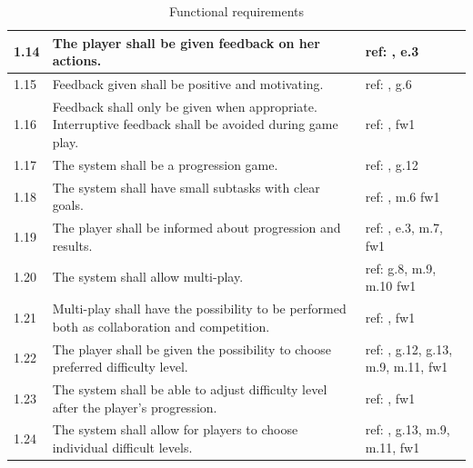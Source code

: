\begin{table} [H]
\centering
\begin{tabular}{|>{\raggedright}p{}|p{}|p{}|}
\hline
1.14 & The player shall be given feedback on her actions. & ref: \cite{sweetser}, e.3 \\ \hline
1.15 & Feedback given shall be positive and motivating. & ref: \cite{sweetser}, g.6 \\ \hline
1.16 & Feedback shall only be given when appropriate. Interruptive feedback shall be avoided during game play. &  ref: \cite{sweetser}, fw1 \\ \hline
1.17 & The system shall be a progression game. & ref: \cite{understandingvg} \cite{sweetser}, g.12 \\ \hline
1.18 & The system shall have small subtasks with clear goals. & ref: \cite{sweetser}, m.6 fw1\\ \hline
1.19 & The player shall be informed about progression and results. & ref: \cite{sweetser}, e.3, m.7, fw1 \\ \hline
1.20 & The system shall allow multi-play. & ref: g.8, m.9, m.10 fw1 \\ \hline
1.21 & Multi-play shall have the possibility to be performed both as collaboration and competition. & ref: \cite{sweetser}, fw1\\ \hline
1.22 & The player shall be given the possibility to choose preferred difficulty level. & ref: \cite{sweetser}, g.12, g.13, m.9, m.11, fw1\\ \hline
1.23 & The system shall be able to adjust difficulty level after the player's progression. & ref: \cite{sweetser}, fw1 \\ \hline
1.24 & The system shall allow for players to choose individual difficult levels. & ref: \cite{sweetser}, g.13, m.9, m.11, fw1\\ \hline
    \end{tabular}
    \caption[Functional requirements, part 2]{Functional requirements}
    \label{tab:func2}
\end{table} 


